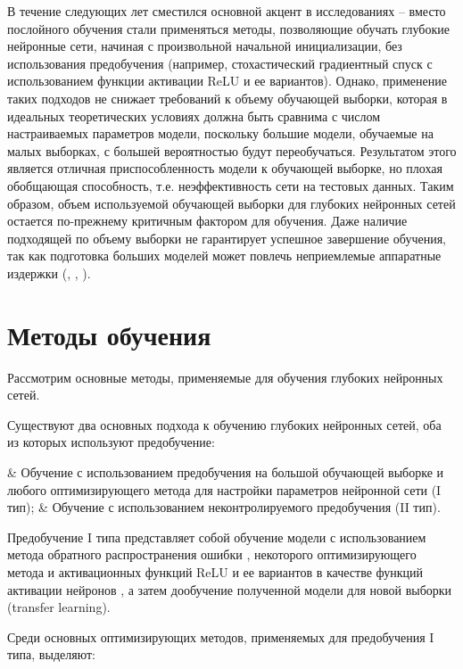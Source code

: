 В течение следующих лет сместился основной акцент в исследованиях -- вместо послойного обучения стали применяться методы, позволяющие обучать глубокие нейронные сети, начиная с произвольной начальной инициализации, без использования предобучения (например, стохастический градиентный спуск с использованием функции активации ReLU и ее вариантов). Однако, применение таких подходов не снижает требований к объему обучающей выборки, которая в идеальных теоретических условиях должна быть сравнима с числом настраиваемых параметров модели, поскольку большие модели, обучаемые на малых выборках, с большей вероятностью будут переобучаться. Результатом этого является отличная приспособленность модели к обучающей выборке, но плохая обобщающая способность, т.е. неэффективность сети на тестовых данных. Таким образом, объем используемой обучающей выборки для глубоких нейронных сетей остается по-прежнему критичным фактором для обучения. Даже наличие подходящей по объему выборки не гарантирует успешное завершение обучения, так как подготовка больших моделей может повлечь неприемлемые аппаратные издержки (\cite{alpaca2023}, \cite{alpacagithub}, \cite{zhang2022opt}).

\section{Методы обучения}

Рассмотрим основные методы, применяемые для обучения глубоких нейронных сетей.

Существуют два основных подхода к обучению глубоких нейронных сетей, оба из которых используют предобучение:

\begin{easylistNum}    
    & Обучение с использованием предобучения на большой обучающей выборке и любого оптимизирующего метода для настройки параметров нейронной сети (I тип);
	& Обучение с использованием неконтролируемого предобучения (II тип).
\end{easylistNum}

Предобучение I типа представляет собой обучение модели с использованием метода обратного распространения ошибки \cite{Glorot2011}, некоторого оптимизирующего метода и активационных функций ReLU и ее вариантов в качестве функций активации нейронов \cite{LeCun2015}, а затем дообучение полученной модели для новой выборки (transfer learning). 

Среди основных оптимизирующих методов, применяемых для предобучения I типа, выделяют:

